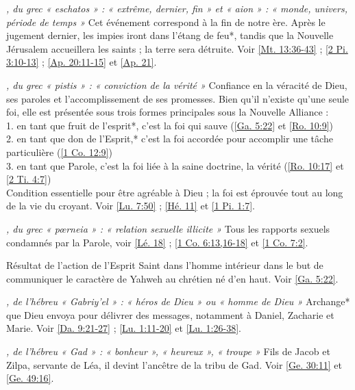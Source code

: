 \begin{multicols}{2}
\textit{, du grec « eschatos » : « extrême, dernier, fin » et « aion » : « monde, univers, période de temps »}\newline
Cet événement correspond à la fin de notre ère. Après le jugement dernier, les impies iront dans l'étang de feu*, tandis que la Nouvelle Jérusalem accueillera les saints ; la terre sera détruite. Voir \vref{Mt. 13:36-43} ; \vref{2 Pi. 3:10-13} ; \vref{Ap. 20:11-15} et \vref{Ap. 21}.

\textit{, du grec « pistis » : « conviction de la vérité »}\newline
Confiance en la véracité de Dieu, ses paroles et l'accomplissement de ses promesses. Bien qu'il n'existe qu'une seule foi, elle est présentée sous trois formes principales sous la Nouvelle Alliance :
\\1. en tant que fruit de l'esprit*, c'est la foi qui sauve (\vref{Ga. 5:22} et \vref{Ro. 10:9})
\\2. en tant que don de l'Esprit,* c'est la foi accordée pour accomplir une tâche particulière (\vref{1 Co. 12:9})
\\3. en tant que Parole, c'est la foi liée à la saine doctrine, la vérité (\vref{Ro. 10:17} et \vref{2 Ti. 4:7})
\\Condition essentielle pour être agréable à Dieu ; la foi est éprouvée tout au long de la vie du croyant. Voir \vref{Lu. 7:50} ; \vref{Hé. 11} et \vref{1 Pi. 1:7}.

\textit{, du grec « pœrneia » : « relation sexuelle illicite »}\newline
Tous les rapports sexuels condamnés par la Parole, voir \vref{Lé. 18} ; \vref{1 Co. 6:13,16-18} et \vref{1 Co. 7:2}.

\textit{}\newline
Résultat de l'action de l'Esprit Saint dans l'homme intérieur dans le but de communiquer le caractère de Yahweh au chrétien né d'en haut. Voir \vref{Ga. 5:22}.

\textit{, de l'hébreu « Gabriy'el » : « héros de Dieu » ou « homme de Dieu »}\newline
Archange* que Dieu envoya pour délivrer des messages, notamment à Daniel, Zacharie et Marie. Voir \vref{Da. 9:21-27} ; \vref{Lu. 1:11-20} et \vref{Lu. 1:26-38}.

\textit{, de l'hébreu « Gad » : « bonheur », « heureux », « troupe »}\newline
Fils de Jacob et Zilpa, servante de Léa, il devint l'ancêtre de la tribu de Gad. Voir \vref{Ge. 30:11} et \vref{Ge. 49:16}.


\end{multicols}
